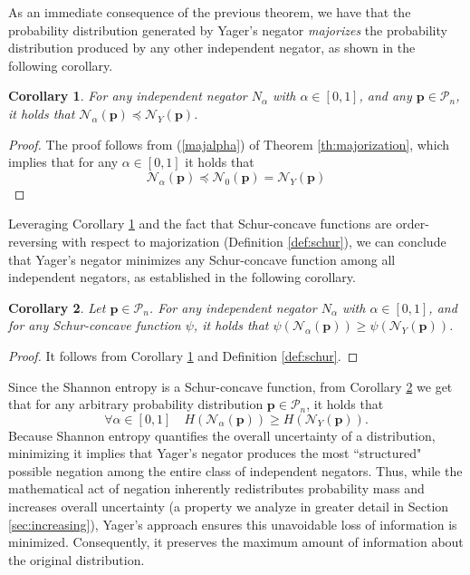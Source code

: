 \documentclass[pdflatex,sn-basic,iicol]{sn-jnl}%
\theoremstyle{thmstyleone}%
\newtheorem{corollary}{Corollary}[theorem]
\theoremstyle{thmstyletwo}%
\theoremstyle{thmstylethree}%
\newcommand{\N}{\mathcal{N}}
\newcommand{\cP}{\mathcal{P}}
\newcommand{\bp}{\mathbf{p}}
\begin{document}
As an immediate consequence of the previous theorem, we have that the 
probability distribution generated by Yager's negator \textit{majorizes} 
the probability distribution produced by any other independent negator, as shown in the following corollary.

\begin{corollary}\label{cor:majorization}
For any independent negator $N_\alpha$ with $\alpha\in[0,1]$, and any $\bp\in\cP_n$, it holds that $\N_\alpha(\bp) \preceq \N_Y(\bp)$.
\end{corollary}
\begin{proof}
The proof follows from (\ref{majalpha}) of Theorem \ref{th:majorization}, which  implies that for any 
$\alpha\in[0,1]$ it holds that
\begin{equation}\label{n1}
\N_\alpha(\bp) \preceq \N_0(\bp)=\N_Y(\bp)
\end{equation}
\end{proof}


Leveraging Corollary \ref{cor:majorization} and the fact that Schur-concave functions are order-reversing with respect to majorization (Definition \ref{def:schur}), we can conclude that Yager's negator minimizes any Schur-concave function among all independent negators, as established in the following corollary.

\begin{corollary}
\label{cor:phi_function}
Let $\bp\in\cP_n$.
For any independent negator $N_\alpha$ with $\alpha\in[0,1]$,  and for any Schur-concave function $\psi$, it holds that $\psi(\N_\alpha(\bp)) \geq \psi(\N_Y(\bp))$.
\end{corollary}
\begin{proof}
It follows from Corollary \ref{cor:majorization} and Definition \ref{def:schur}.
\end{proof}

Since the Shannon entropy is a Schur-concave function, from  Corollary \ref{cor:phi_function} we get that for any arbitrary probability distribution $\bp\in\cP_n$, it holds that
\begin{equation}
  \forall \alpha\in[0,1] \quad  H(\N_\alpha(\bp)) \geq H(\N_Y(\bp)).
\end{equation}
Because Shannon entropy quantifies the overall uncertainty of a distribution, minimizing it implies that Yager's negator produces the most ``structured" possible
negation among the entire class of independent negators. Thus, while the mathematical act of negation inherently redistributes probability mass and increases overall uncertainty (a property we analyze in greater detail
in Section \ref{sec:increasing}), Yager's approach ensures this unavoidable loss of information is minimized. Consequently, it preserves the maximum amount of information about the original distribution.
\end{document}
